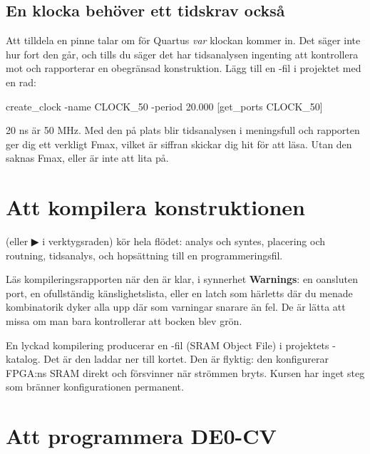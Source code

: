 \subsection{En klocka behöver ett tidskrav också}
\label{app:quartus:sdc}

Att tilldela  en pinne talar om för Quartus \emph{var} klockan kommer in. Det säger
inte hur fort den går, och tills du säger det har tidsanalysen ingenting att kontrollera mot och
rapporterar en obegränsad konstruktion. Lägg till en -fil i projektet med en rad:

\begin{console}
create_clock -name CLOCK_50 -period 20.000 [get_ports CLOCK_50]
\end{console}

20 ns är 50 MHz. Med den på plats blir tidsanalysen i 
meningsfull och rapporten ger dig ett verkligt Fmax, vilket är siffran 
skickar dig hit för att läsa. Utan den saknas Fmax, eller är inte att lita på.

\section{Att kompilera konstruktionen}
\label{app:quartus:compile}

 (eller ▶ i verktygsraden) kör hela flödet: analys och syntes,
placering och routning, tidsanalys, och hopsättning till en programmeringsfil.

Läs kompileringsrapporten när den är klar, i synnerhet \textbf{Warnings}: en oansluten port, en
ofullständig känslighetslista, eller en latch som härletts där du menade kombinatorik dyker alla upp
där som varningar snarare än fel. De är lätta att missa om man bara kontrollerar att bocken blev
grön.

En lyckad kompilering producerar en -fil (SRAM Object File) i projektets
-katalog. Det är den  laddar ner till kortet. Den är
flyktig: den konfigurerar FPGA:ns SRAM direkt och försvinner när strömmen bryts. Kursen har inget
steg som bränner konfigurationen permanent.

\section{Att programmera DE0-CV}
\label{app:quartus:program}

